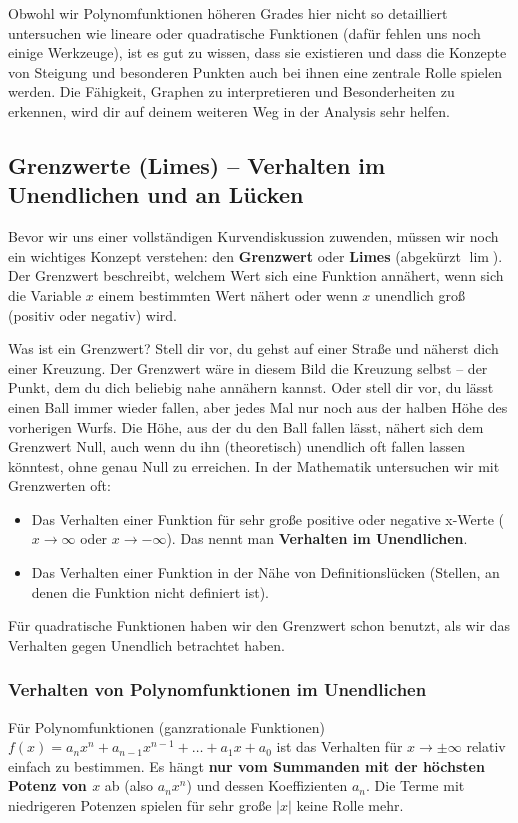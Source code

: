 Obwohl wir Polynomfunktionen höheren Grades hier nicht so detailliert untersuchen wie lineare oder quadratische Funktionen (dafür fehlen uns noch einige Werkzeuge), ist es gut zu wissen, dass sie existieren und dass die Konzepte von Steigung und besonderen Punkten auch bei ihnen eine zentrale Rolle spielen werden. Die Fähigkeit, Graphen zu interpretieren und Besonderheiten zu erkennen, wird dir auf deinem weiteren Weg in der Analysis sehr helfen. \\

\subsection{Grenzwerte (Limes) – Verhalten im Unendlichen und an Lücken}
\label{subsec:grenzwerte}

Bevor wir uns einer vollständigen Kurvendiskussion zuwenden, müssen wir noch ein wichtiges Konzept verstehen: den \textbf{Grenzwert} oder \textbf{Limes} (abgekürzt $\lim$). Der Grenzwert beschreibt, welchem Wert sich eine Funktion annähert, wenn sich die Variable $x$ einem bestimmten Wert nähert oder wenn $x$ unendlich groß (positiv oder negativ) wird.

\begin{infoboxumgebung}{Was ist ein Grenzwert?}
Stell dir vor, du gehst auf einer Straße und näherst dich einer Kreuzung. Der Grenzwert wäre in diesem Bild die Kreuzung selbst – der Punkt, dem du dich beliebig nahe annähern kannst.
Oder stell dir vor, du lässt einen Ball immer wieder fallen, aber jedes Mal nur noch aus der halben Höhe des vorherigen Wurfs. Die Höhe, aus der du den Ball fallen lässt, nähert sich dem Grenzwert Null, auch wenn du ihn (theoretisch) unendlich oft fallen lassen könntest, ohne genau Null zu erreichen.
In der Mathematik untersuchen wir mit Grenzwerten oft:
\begin{itemize}
    \item Das Verhalten einer Funktion für sehr große positive oder negative x-Werte ($x \to \infty$ oder $x \to -\infty$). Das nennt man \textbf{Verhalten im Unendlichen}.
    \item Das Verhalten einer Funktion in der Nähe von Definitionslücken (Stellen, an denen die Funktion nicht definiert ist).
\end{itemize}
Für quadratische Funktionen haben wir den Grenzwert schon benutzt, als wir das Verhalten gegen Unendlich betrachtet haben.
\end{infoboxumgebung}

\subsubsection{Verhalten von Polynomfunktionen im Unendlichen}
Für Polynomfunktionen (ganzrationale Funktionen) $f(x) = a_n x^n + a_{n-1}x^{n-1} + \dots + a_1x + a_0$ ist das Verhalten für $x \to \pm \infty$ relativ einfach zu bestimmen. Es hängt \textbf{nur vom Summanden mit der höchsten Potenz von $x$} ab (also $a_n x^n$) und dessen Koeffizienten $a_n$. Die Terme mit niedrigeren Potenzen spielen für sehr große $|x|$ keine Rolle mehr.

